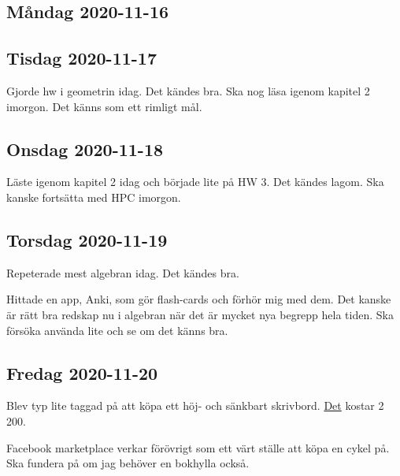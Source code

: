 \subsection{Måndag 2020-11-16}

\subsection{Tisdag 2020-11-17}

Gjorde hw i geometrin idag. Det kändes bra. Ska nog läsa igenom kapitel 2 imorgon. Det känns som ett rimligt mål.


\subsection{Onsdag 2020-11-18}

Läste igenom kapitel 2 idag och började lite på HW 3. Det kändes lagom. Ska kanske fortsätta med HPC imorgon.


\subsection{Torsdag 2020-11-19}

Repeterade mest algebran idag. Det kändes bra.

Hittade en app, Anki, som gör flash-cards och förhör mig med dem. Det kanske är rätt bra redskap nu i algebran när det är mycket nya begrepp hela tiden. Ska försöka använda lite och se om det känns bra.


\subsection{Fredag 2020-11-20}

Blev typ lite taggad på att köpa ett höj- och sänkbart skrivbord. \href{https://www.ikea.com/se/sv/p/skarsta-skrivbord-sitt-sta-beige-vit-s09320813/}{\color{blue}Det} kostar 2\,200.

Facebook marketplace verkar förövrigt som ett värt ställe att köpa en cykel på. Ska fundera på om jag behöver en bokhylla också.


